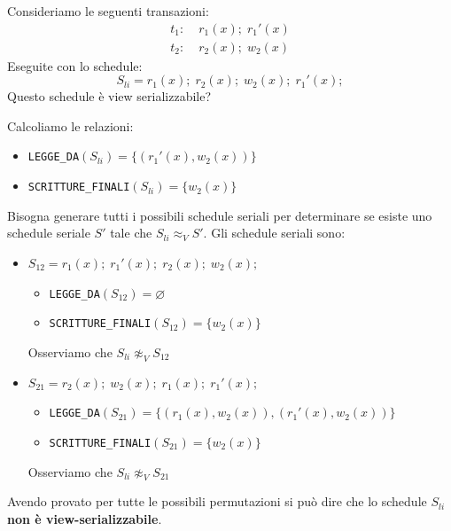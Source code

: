 \documentclass[a4paper]{article}
\begin{document}
\begin{exercise}
  Consideriamo le seguenti transazioni:
  \[
  \begin{aligned}
    t_1:\; & r_1(x); \; r_1'(x) \\
    t_2:\; & r_2(x); \; w_2(x)
  \end{aligned}
  \] 
  Eseguite con lo schedule:
  \[
    S_{li} = r_1(x); \; r_2(x); \; w_2(x); \; r_1'(x);
  \] 
  Questo schedule è view serializzabile?

  \vspace{1em}
  \noindent
  Calcoliamo le relazioni:
  \begin{itemize}
    \item \texttt{LEGGE\_DA}\( (S_{li}) = \{ (r_1'(x), w_2(x)) \} \)
    \item \texttt{SCRITTURE\_FINALI}\( (S_{li}) = \{ w_2(x) \} \)
  \end{itemize}
  
  \vspace{1em}
  \noindent
  Bisogna generare tutti i possibili schedule seriali per determinare se
  esiste uno schedule seriale \( S' \) tale che \( S_{li} \approx_V S' \).
  Gli schedule seriali sono:
  \begin{itemize}
    \item \( S_{12} = r_1(x); \; r_1'(x); \; r_2(x); \; w_2(x); \) 
      \begin{itemize}
        \item \texttt{LEGGE\_DA}\( (S_{12}) = \varnothing \)
        \item \texttt{SCRITTURE\_FINALI}\( (S_{12}) = \{ w_2(x) \} \)
      \end{itemize}
      Osserviamo che \( S_{li} \not\approx_V S_{12} \)

    \item \( S_{21} = r_2(x); \; w_2(x); \; r_1(x); \; r_1'(x);\,\) 
      \begin{itemize}
        \item \texttt{LEGGE\_DA}\( (S_{21}) = \{ (r_1(x), w_2(x)), (r_1'(x), w_2(x)) \} \)
        \item \texttt{SCRITTURE\_FINALI}\( (S_{21}) = \{ w_2(x) \} \)
      \end{itemize}
      Osserviamo che \( S_{li} \not\approx_V S_{21} \)
  \end{itemize}
  Avendo provato per tutte le possibili permutazioni si può dire che lo schedule
  \( S_{li} \) \textbf{non è view-serializzabile}.
\end{exercise}
\end{document}
